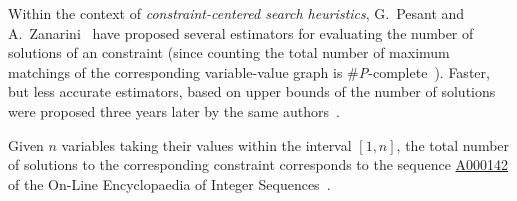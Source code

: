 \begin{ctrdesc}
Within the context of \emph{constraint-centered search heuristics},
G.~Pesant and A.~Zanarini~\cite{ZanariniPesant07b} have proposed several estimators for evaluating the number of solutions
of an  constraint (since counting the total number of maximum matchings of the
corresponding variable\nobreakdash-value graph is \#\emph{P}\nobreakdash-complete~\cite{Valiant79}).
Faster, but less accurate estimators, based on upper bounds of the number of solutions were proposed three years later by
the same authors~\cite{ZanariniPesant10}.

Given $n$ variables taking their values within the interval $[1,n]$,
the total number of solutions to the corresponding  constraint corresponds to
the sequence \href{http://oeis.org/A000142}{A000142}
of the On\nobreakdash-Line Encyclopaedia of Integer Sequences~\cite{Sloane10}.


\end{ctrdesc}
